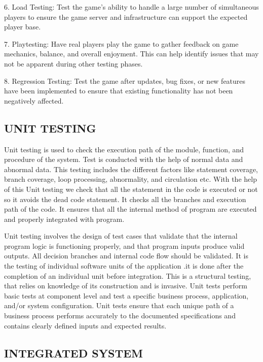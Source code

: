 \documentclass[12pt]{report}
\begin{document}
6. Load Testing:
Test the game's ability to handle a large number of simultaneous players to ensure the game server and infrastructure can support the expected player base.

7. Playtesting:
Have real players play the game to gather feedback on game mechanics, balance, and overall enjoyment. This can help identify issues that may not be apparent during other testing phases.

8. Regression Testing:
Test the game after updates, bug fixes, or new features have been implemented to ensure that existing functionality has not been negatively affected.



\subsection{UNIT TESTING}
\justifying
\setlength{\parindent}{4em}
\setlength{\parskip}{0.5em}
\renewcommand{\baselinestretch}{1.5}
\normalsize

Unit testing is used to check the execution path of the module, function, and procedure of 
the system. Test is conducted with the help of normal data and abnormal data. This testing 
includes the different factors like statement coverage, branch coverage, loop processing, 
abnormality, and circulation etc. With the help of this Unit testing we check that all the 
statement in the code is executed or not so it avoids the dead code statement. It checks all 
the branches and execution path of the code. It ensures that all the internal method of 
program are executed and properly integrated with program.

Unit testing involves the design of test cases that validate that the internal program logic is 
functioning properly, and that program inputs produce valid outputs. All decision branches 
and internal code flow should be validated. It is the testing of individual software units of 
the application .it is done after the completion of an individual unit before integration. This 
is a structural testing, that relies on knowledge of its construction and is invasive. Unit tests 
perform basic tests at component level and test a specific business process, application, 
and/or system configuration. Unit tests ensure that each unique path of a business process 
performs accurately to the documented specifications and contains clearly defined inputs 
and expected results.

\subsection{INTEGRATED SYSTEM}
\justifying
\setlength{\parindent}{4em}
\setlength{\parskip}{0.5em}
\renewcommand{\baselinestretch}{1.5}
\normalsize
\end{document}
